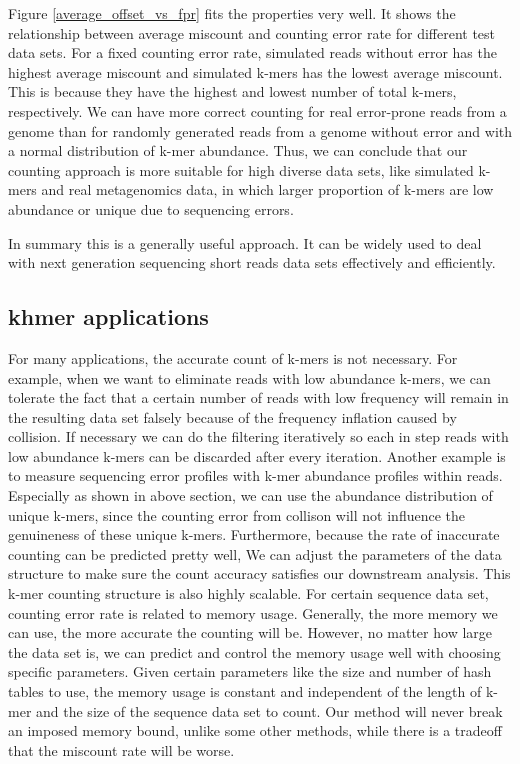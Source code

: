 \documentclass{article}
\begin{document}
Figure \ref{average_offset_vs_fpr} fits the properties very well. It
shows the relationship between average miscount and counting error
rate for different test data sets. For a fixed counting error rate,
simulated reads without error has the highest average miscount and
simulated k-mers has the lowest average miscount.  This is because
they have the highest and lowest number of total k-mers,
respectively. We can have more correct counting for real error-prone
reads from a genome than for randomly generated reads from a genome
without error and with a normal distribution of k-mer abundance. Thus,
we can conclude that our counting approach is more suitable for high
diverse data sets, like simulated k-mers and real metagenomics data,
in which larger proportion of k-mers are low abundance or unique due
to sequencing errors.

In summary this is a generally useful approach. It can be widely used to
deal with next generation sequencing short reads data sets effectively 
and efficiently.

\subsection{khmer applications}

For many applications, the accurate count of k-mers is not
necessary. For example, when we want to eliminate reads with low
abundance k-mers, we can tolerate the fact that a certain number of
reads with low frequency will remain in the resulting data set falsely
because of the frequency inflation caused by collision. If necessary
we can do the filtering iteratively so each in step reads with low
abundance k-mers can be discarded after every iteration. Another
example is to measure sequencing error profiles with k-mer abundance
profiles within reads. Especially as shown in above section, we can
use the abundance distribution of unique k-mers, since the counting
error from collison will not influence the genuineness of these unique
k-mers. Furthermore, because the rate of inaccurate counting can be
predicted pretty well, We can adjust the parameters of the data
structure to make sure the count accuracy satisfies our downstream
analysis. This k-mer counting structure is also highly scalable. For
certain sequence data set, counting error rate is related to memory
usage. Generally, the more memory we can use, the more accurate the
counting will be. However, no matter how large the data set is, we can
predict and control the memory usage well with choosing specific
parameters. Given certain parameters like the size and number of hash
tables to use, the memory usage is constant and independent of the
length of k-mer and the size of the sequence data set to count. Our
method will never break an imposed memory bound, unlike some other
methods, while there is a tradeoff that the miscount rate will be
worse.
\end{document}
